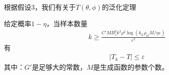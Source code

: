             \par
            根据假设3，我们有关于$T(\theta,\phi)$的泛化定理
            \begin{theorem}[3]
            给定概率$1-\eta$，当样本数量
            \begin{align*}
            k \geqslant \frac{C'MB_z^2k^2\rho^2\log(k_L\rho_GM/\eta\varepsilon)}{\varepsilon^2}
            \end{align*}
            有
            \begin{align*}
            |T_k - T| \leqslant \varepsilon
            \end{align*}
            其中：$G'$是足够大的常数，$M$是生成函数的参数个数。
            \end{theorem}
